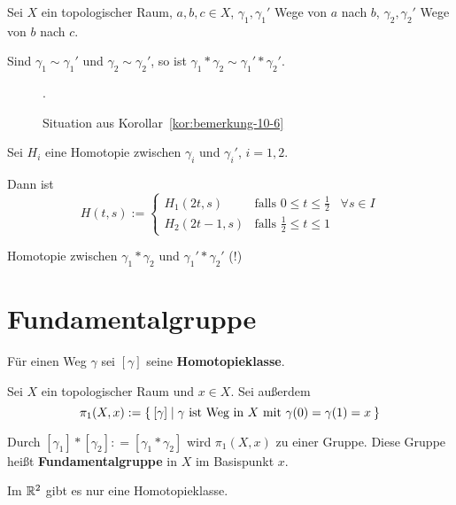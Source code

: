 \begin{korollar}\label{kor:bemerkung-10-6}
    Sei $X$ ein topologischer Raum, $a,b,c \in X$, $\gamma_1, \gamma_1'$
    Wege von $a$ nach $b$, $\gamma_2, \gamma_2'$ Wege von $b$ nach $c$.

    Sind $\gamma_1 \sim \gamma_1'$ und $\gamma_2 \sim \gamma_2'$, so
    ist $\gamma_1 * \gamma_2 \sim \gamma_1 ' * \gamma_2'$.
\end{korollar}

\begin{figure}
    \centering
    
    \caption{Situation aus Korollar~\ref{kor:bemerkung-10-6}}.
    \label{fig:situation-bemerkung-10-6}
\end{figure}

\begin{beweis}
    Sei $H_i$ eine Homotopie zwischen $\gamma_i$ und $\gamma_i'$,
    $i=1,2$.

    Dann ist 
    \[H(t,s) := \begin{cases}
        H_1(2t, s)  &\text{falls } 0 \leq t \leq \frac{1}{2}\;\;\;\forall s \in I\\
        H_2(2t-1,s) &\text{falls } \frac{1}{2} \leq t \leq 1
    \end{cases}\]

    Homotopie zwischen $\gamma_1 * \gamma_2$ und $\gamma_1' * \gamma_2 '$ (!)
\end{beweis}

\section{Fundamentalgruppe}
Für einen Weg $\gamma$ sei $[\gamma]$ seine \textbf{Homotopieklasse}.

\begin{definition}
    Sei $X$ ein topologischer Raum und $x \in X$. Sei außerdem
    \[\pi_1(X,x) := \Set{[\gamma] | \gamma \text{ ist Weg in } X \text{ mit } \gamma(0) = \gamma(1) = x}\]

    Durch $[\gamma_1] * [\gamma_2] : = [\gamma_1 * \gamma_2]$ wird
    $\pi_1(X,x)$ zu einer Gruppe. Diese Gruppe heißt \textbf{Fundamentalgruppe}
    in $X$ im Basispunkt $x$.
\end{definition}

\begin{bemerkung}
    Im $\mathbb{R}^2$ gibt es nur eine Homotopieklasse.
\end{bemerkung}

